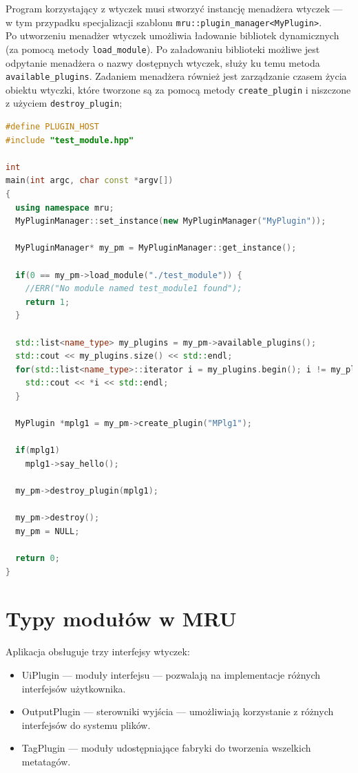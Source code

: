 \par
Program korzystający z wtyczek musi stworzyć instancję menadżera wtyczek --- w tym przypadku specjalizacji szablonu \texttt{mru::plugin\_manager<MyPlugin>}.\\
Po utworzeniu menadżer wtyczek umożliwia ładowanie bibliotek dynamicznych (za pomocą metody \texttt{load\_module}). Po załadowaniu biblioteki możliwe jest odpytanie menadżera o nazwy dostępnych wtyczek, służy ku temu metoda \texttt{available\_plugins}.
Zadaniem menadżera również jest zarządzanie czasem życia obiektu wtyczki, które tworzone są za pomocą metody \texttt{create\_plugin} i niszczone z użyciem \texttt{destroy\_plugin};
\begin{lstlisting}[caption={ main.cpp}, language=C++]
#define PLUGIN_HOST
#include "test_module.hpp"

int
main(int argc, char const *argv[])
{
  using namespace mru;
  MyPluginManager::set_instance(new MyPluginManager("MyPlugin"));

  MyPluginManager* my_pm = MyPluginManager::get_instance();

  if(0 == my_pm->load_module("./test_module")) {
    //ERR("No module named test_module1 found");
    return 1;
  }

  std::list<name_type> my_plugins = my_pm->available_plugins();
  std::cout << my_plugins.size() << std::endl;
  for(std::list<name_type>::iterator i = my_plugins.begin(); i != my_plugins.end(); ++i) {
    std::cout << *i << std::endl;
  }

  MyPlugin *mplg1 = my_pm->create_plugin("MPlg1");

  if(mplg1)
    mplg1->say_hello();

  my_pm->destroy_plugin(mplg1); 
  
  my_pm->destroy();
  my_pm = NULL;
  
  return 0;
}
\end{lstlisting}

\section{Typy modułów w MRU}
\label{moduly}
Aplikacja obsługuje trzy interfejsy wtyczek:
\begin{itemize}
\item UiPlugin --- moduły interfejsu --- pozwalają na implementacje różnych interfejsów użytkownika.
\item OutputPlugin --- sterowniki wyjścia --- umożliwiają korzystanie z różnych interfejsów do systemu plików.
\item TagPlugin --- moduły udostępniające fabryki do tworzenia wszelkich metatagów.
\end{itemize}

